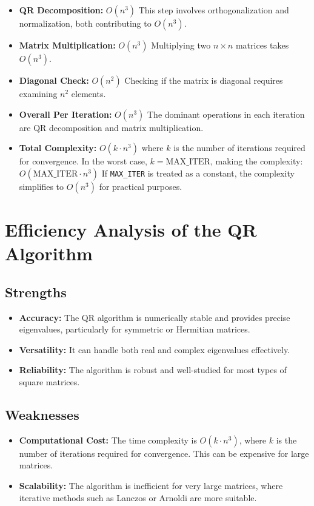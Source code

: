 \documentclass[12pt]{article}
\begin{document}
\begin{itemize}
    \item \textbf{QR Decomposition:} $O(n^3)$  
    This step involves orthogonalization and normalization, both contributing to $O(n^3)$.

    \item \textbf{Matrix Multiplication:} $O(n^3)$  
    Multiplying two $n \times n$ matrices takes $O(n^3)$.

    \item \textbf{Diagonal Check:} $O(n^2)$  
    Checking if the matrix is diagonal requires examining $n^2$ elements.

    \item \textbf{Overall Per Iteration:} $O(n^3)$  
    The dominant operations in each iteration are QR decomposition and matrix multiplication.

    \item \textbf{Total Complexity:} $O(k \cdot n^3)$  
    where $k$ is the number of iterations required for convergence. In the worst case, $k = \text{MAX\_ITER}$, making the complexity:  
    $O(\text{MAX\_ITER} \cdot n^3)$  
    If \texttt{MAX\_ITER} is treated as a constant, the complexity simplifies to $O(n^3)$ for practical purposes.
\end{itemize}

\section*{Efficiency Analysis of the QR Algorithm}

\subsection*{Strengths}
\begin{itemize}
    \item \textbf{Accuracy:} The QR algorithm is numerically stable and provides precise eigenvalues, particularly for symmetric or Hermitian matrices.
    \item \textbf{Versatility:} It can handle both real and complex eigenvalues effectively.
    \item \textbf{Reliability:} The algorithm is robust and well-studied for most types of square matrices.
\end{itemize}

\subsection*{Weaknesses}
\begin{itemize}
    \item \textbf{Computational Cost:} 
    The time complexity is $O(k \cdot n^3)$, where $k$ is the number of iterations required for convergence. This can be expensive for large matrices.
    \item \textbf{Scalability:} The algorithm is inefficient for very large matrices, where iterative methods such as Lanczos or Arnoldi are more suitable.
\end{itemize}
\end{document}

